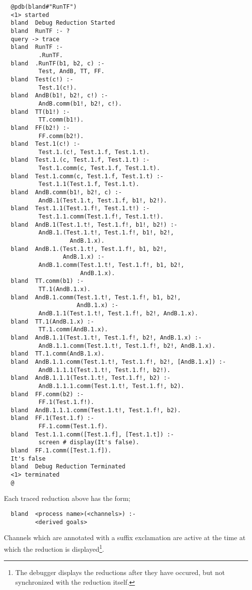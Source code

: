 \begin{verbatim}
  @pdb(bland#"RunTF")
  <1> started
  bland  Debug Reduction Started
  bland  RunTF :- ?
  query -> trace
  bland  RunTF :- 
          .RunTF.
  bland  .RunTF(b1, b2, c) :- 
          Test, AndB, TT, FF.
  bland  Test(c!) :- 
          Test.1(c!).
  bland  AndB(b1!, b2!, c!) :- 
          AndB.comm(b1!, b2!, c!).
  bland  TT(b1!) :- 
          TT.comm(b1!).
  bland  FF(b2!) :- 
          FF.comm(b2!).
  bland  Test.1(c!) :- 
          Test.1.(c!, Test.1.f, Test.1.t).
  bland  Test.1.(c, Test.1.f, Test.1.t) :- 
          Test.1.comm(c, Test.1.f, Test.1.t).
  bland  Test.1.comm(c, Test.1.f, Test.1.t) :- 
          Test.1.1(Test.1.f, Test.1.t).
  bland  AndB.comm(b1!, b2!, c) :- 
          AndB.1(Test.1.t, Test.1.f, b1!, b2!).
  bland  Test.1.1(Test.1.f!, Test.1.t!) :- 
          Test.1.1.comm(Test.1.f!, Test.1.t!).
  bland  AndB.1(Test.1.t!, Test.1.f!, b1!, b2!) :- 
          AndB.1.(Test.1.t!, Test.1.f!, b1!, b2!,
                   AndB.1.x).
  bland  AndB.1.(Test.1.t!, Test.1.f!, b1, b2!,
                 AndB.1.x) :- 
          AndB.1.comm(Test.1.t!, Test.1.f!, b1, b2!,
                      AndB.1.x).
  bland  TT.comm(b1) :- 
          TT.1(AndB.1.x).
  bland  AndB.1.comm(Test.1.t!, Test.1.f!, b1, b2!,
                     AndB.1.x) :- 
          AndB.1.1(Test.1.t!, Test.1.f!, b2!, AndB.1.x).
  bland  TT.1(AndB.1.x) :- 
          TT.1.comm(AndB.1.x).
  bland  AndB.1.1(Test.1.t!, Test.1.f!, b2!, AndB.1.x) :- 
          AndB.1.1.comm(Test.1.t!, Test.1.f!, b2!, AndB.1.x).
  bland  TT.1.comm(AndB.1.x).
  bland  AndB.1.1.comm(Test.1.t!, Test.1.f!, b2!, [AndB.1.x]) :- 
          AndB.1.1.1(Test.1.t!, Test.1.f!, b2!).
  bland  AndB.1.1.1(Test.1.t!, Test.1.f!, b2) :- 
          AndB.1.1.1.comm(Test.1.t!, Test.1.f!, b2).
  bland  FF.comm(b2) :- 
          FF.1(Test.1.f!).
  bland  AndB.1.1.1.comm(Test.1.t!, Test.1.f!, b2).
  bland  FF.1(Test.1.f) :- 
          FF.1.comm(Test.1.f).
  bland  Test.1.1.comm([Test.1.f], [Test.1.t]) :- 
          screen # display(It's false).
  bland  FF.1.comm([Test.1.f]).
  It's false
  bland  Debug Reduction Terminated
  <1> terminated
  @
\end{verbatim}

\noindent
Each traced reduction above has the form;

\begin{verbatim}
  bland  <process name>(<channels>) :-
         <derived goals>
\end{verbatim}

\noindent
Channels which are annotated with a suffix exclamation are
active at the time at which the reduction is displayed\footnote{
The debugger displays the reductions after they have occured,
but not synchronized with the reduction itself.}.

